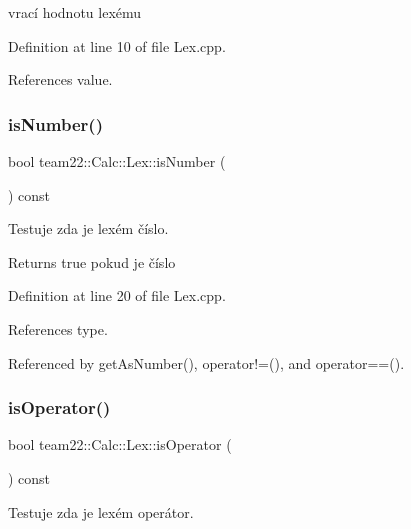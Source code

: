 vrací hodnotu lexému 



Definition at line 10 of file Lex.\+cpp.



References value.

\mbox{\label{classteam22_1_1_calc_1_1_lex_a21f9fe1956185bfb6d80d094846a44f1}} 
\subsubsection{\texorpdfstring{is\+Number()}{isNumber()}}
{\footnotesize\ttfamily bool team22\+::\+Calc\+::\+Lex\+::is\+Number (\begin{DoxyParamCaption}{ }\end{DoxyParamCaption}) const}



Testuje zda je lexém číslo. 

\begin{DoxyReturn}{Returns}
true pokud je číslo 
\end{DoxyReturn}


Definition at line 20 of file Lex.\+cpp.



References type.



Referenced by get\+As\+Number(), operator!=(), and operator==().

\mbox{\label{classteam22_1_1_calc_1_1_lex_a965eff3f3264440279ea9a1f1d3a3cfe}} 
\subsubsection{\texorpdfstring{is\+Operator()}{isOperator()}}
{\footnotesize\ttfamily bool team22\+::\+Calc\+::\+Lex\+::is\+Operator (\begin{DoxyParamCaption}{ }\end{DoxyParamCaption}) const}



Testuje zda je lexém operátor. 


